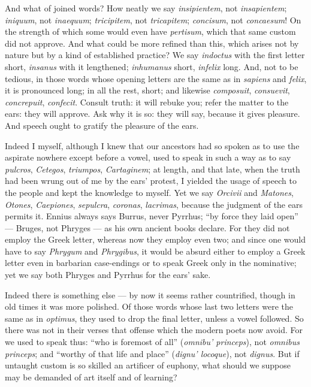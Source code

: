  And what of joined words? How neatly we say \textit{insipientem}, not \textit{insapientem}; \textit{iniquum}, not \textit{inaequum}; \textit{tricipitem}, not \textit{tricapitem}; \textit{concisum}, not \textit{concaesum}! On the strength of which some would even have \textit{pertisum}, which that same custom did not approve. And what could be more refined than this, which arises not by nature but by a kind of established practice? We say \textit{indoctus} with the first letter short, \textit{insanus} with it lengthened; \textit{inhumanus} short, \textit{infelix} long. And, not to be tedious, in those words whose opening letters are the same as in \textit{sapiens} and \textit{felix}, it is pronounced long; in all the rest, short; and likewise \textit{composuit}, \textit{consuevit}, \textit{concrepuit}, \textit{confecit}. Consult truth: it will rebuke you; refer the matter to the ears: they will approve. Ask why it is so: they will say, because it gives pleasure. And speech ought to gratify the pleasure of the ears.

 Indeed I myself, although I knew that our ancestors had so spoken as to use the aspirate nowhere except before a vowel, used to speak in such a way as to say \textit{pulcros}, \textit{Cetegos}, \textit{triumpos}, \textit{Cartaginem}; at length, and that late, when the truth had been wrung out of me by the ears' protest, I yielded the usage of speech to the people and kept the knowledge to myself. Yet we say \textit{Orcivii} and \textit{Matones}, \textit{Otones}, \textit{Caepiones}, \textit{sepulcra}, \textit{coronas}, \textit{lacrimas}, because the judgment of the ears permits it. Ennius always says Burrus, never Pyrrhus; ``by force they laid open'' — Bruges, not Phryges — as his own ancient books declare. For they did not employ the Greek letter, whereas now they employ even two; and since one would have to say \textit{Phrygum} and \textit{Phrygibus}, it would be absurd either to employ a Greek letter even in barbarian case-endings or to speak Greek only in the nominative; yet we say both Phryges and Pyrrhus for the ears' sake.

 Indeed there is something else — by now it seems rather countrified, though in old times it was more polished. Of those words whose last two letters were the same as in \textit{optimus}, they used to drop the final letter, unless a vowel followed. So there was not in their verses that offense which the modern poets now avoid. For we used to speak thus: ``who is foremost of all'' (\textit{omnibu' princeps}), not \textit{omnibus princeps}; and ``worthy of that life and place'' (\textit{dignu' locoque}), not \textit{dignus}. But if untaught custom is so skilled an artificer of euphony, what should we suppose may be demanded of art itself and of learning?

